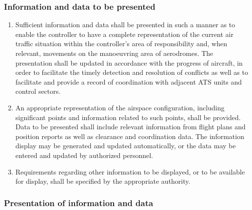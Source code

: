 \documentclass[../vATM.tex]{subfiles}
\begin{document}
    \subsubsection{Information and data to be presented}

    \begin{enumerate}
        \item Sufficient information and data shall be presented in such a manner as to enable the controller to have a complete representation of the current air traffic situation within the controller’s area of responsibility and, when relevant, movements on the manoeuvring area of aerodromes. The presentation shall be updated in accordance with the progress of aircraft, in order to facilitate the timely detection and resolution of conflicts as well as to facilitate and provide a record of coordination with adjacent ATS units and control sectors.
        \item An appropriate representation of the airspace configuration, including significant points and information related to such points, shall be provided. Data to be presented shall include relevant information from flight plans and position reports as well as clearance and coordination data. The information display may be generated and updated automatically, or the data may be entered and updated by authorized personnel.
        \item Requirements regarding other information to be displayed, or to be available for display, shall be specified by the appropriate authority.
    \end{enumerate}

    \subsubsection{Presentation of information and data}
\end{document}
